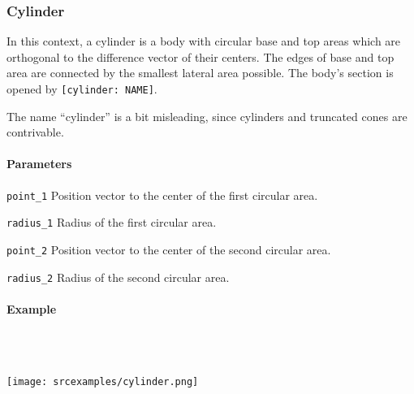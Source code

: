 \subsubsection{Cylinder}
In this context, a cylinder is a body with circular base and top areas which are orthogonal to the difference vector of their centers. The edges of base and top area are connected by the smallest lateral area possible. The body's section is opened by \lstinline{[cylinder: NAME]}.

The name ``cylinder'' is a bit misleading, since cylinders and truncated cones are contrivable.

\paragraph{Parameters}
\begin{description}
 \item{\lstinline{point_1}} Position vector to the center of the first circular area.
 \item{\lstinline{radius_1}} Radius of the first circular area.
 \item{\lstinline{point_2}} Position vector to the center of the second circular area.
 \item{\lstinline{radius_2}} Radius of the second circular area.
\end{description}

\paragraph{Example}\ 


\ \\\texttt{[image: srcexamples/cylinder.png]}